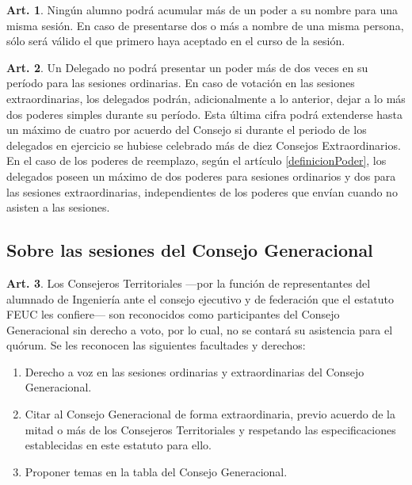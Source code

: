 \documentclass[letterpaper,11pt]{article}
\theoremstyle{definition}%
\newtheorem{art}{Art.} %
\begin{document}
\begin{art}\label{maxPoderesRecividos}
	Ningún alumno podrá acumular más de un poder a su nombre para una misma sesión. En caso de presentarse dos o más a nombre de una misma persona, sólo será válido el que primero haya aceptado en el curso de la sesión.
\end{art}

\begin{art}\label{maxPoderesEmitidos}
	Un Delegado no podrá presentar un poder más de dos veces en su período para las sesiones ordinarias. En caso de votación en las sesiones extraordinarias, los delegados podrán, adicionalmente a lo anterior, dejar a lo más dos poderes simples durante su período. Esta última cifra podrá extenderse hasta un máximo de cuatro por acuerdo del Consejo si durante el periodo de los delegados en ejercicio se hubiese celebrado más de diez Consejos Extraordinarios. En el caso de los poderes de reemplazo, según el artículo \ref{definicionPoder}, los delegados poseen un máximo de dos poderes para sesiones ordinarios y dos para las sesiones extraordinarias, independientes de los poderes que envían cuando no asisten a las sesiones.
\end{art}

\subsection*{Sobre las sesiones del Consejo Generacional}

\begin{art}
	Los Consejeros Territoriales ---por la función de representantes del alumnado de Ingeniería ante el consejo ejecutivo y de federación que el estatuto FEUC les confiere--- son reconocidos como participantes del Consejo Generacional sin derecho a voto, por lo cual, no se contará su asistencia para el quórum. Se les reconocen las siguientes facultades y derechos:
	\begin{enumerate}
		\item Derecho a voz en las sesiones ordinarias y extraordinarias del Consejo Generacional.
		\item Citar al Consejo Generacional de forma extraordinaria, previo acuerdo de la mitad o más de los Consejeros Territoriales y respetando las especificaciones establecidas en este estatuto para ello.
		\item Proponer temas en la tabla del Consejo Generacional.
	\end{enumerate}
\end{art}
\end{document}
